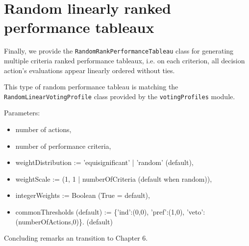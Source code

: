 \section{Random linearly ranked performance tableaux}
\label{sec:5.6}

Finally, we provide the \texttt{RandomRankPerformanceTableau} class for generating multiple criteria ranked performance tableaux, i.e. on each criterion, all decision action's evaluations appear linearly ordered without ties.

This type of random performance tableau is matching the \texttt{RandomLinearVotingProfile} class provided by the \texttt{votingProfiles} module.  
        
Parameters:
\begin{itemize}
\item number of actions,
\item number of performance criteria,
\item weightDistribution := 'equisignificant' | 'random' (default),
\item weightScale := (1, 1 | numberOfCriteria (default when random)),
\item integerWeights := Boolean (True = default),
\item commonThresholds (default) := \{'ind':(0,0), 'pref':(1,0), 'veto':(numberOfActions,0)\}. (default) 
 \end{itemize}


 Concluding remarks an transition to Chapter 6. 
